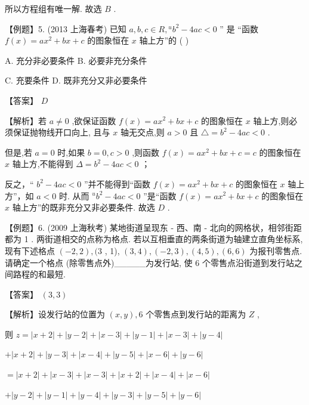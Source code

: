 \documentclass[10pt]{article}
\begin{document}
所以方程组有唯一解. 故选 \(B\) .

【例题】5. (2013 上海春考) 已知 \(a,b,c \in  R,{}^{u}{b}^{2} - {4ac} < 0\) ” 是 “函数 \(f\left( x\right)  = a{x}^{2} + {bx} + c\) 的图象恒在 \(x\) 轴上方”的 ( )

A. 充分非必要条件 B. 必要非充分条件

C. 充要条件 D. 既非充分又非必要条件

【答案】 \(D\)

【解析】若 \(a \neq  0\) ,欲保证函数 \(f\left( x\right)  = a{x}^{2} + {bx} + c\) 的图象恒在 \(x\) 轴上方,则必须保证抛物线开口向上, 且与 \(x\) 轴无交点,则 \(a > 0\) 且 \(\bigtriangleup  = {b}^{2} - {4ac} < 0\) .

但是,若 \(a = 0\) 时,如果 \(b = 0,c > 0\) ,则函数 \(f\left( x\right)  = a{x}^{2} + {bx} + c = c\) 的图象恒在 \(x\) 轴上方,不能得到 \(\Delta  = {b}^{2} - {4ac} < 0\) ；

反之，“ \({b}^{2} - {4ac} < 0\) ”并不能得到“函数 \(f\left( x\right)  = a{x}^{2} + {bx} + c\) 的图象恒在 \(x\) 轴上方”，如 \(a < 0\) 时. 从而 \({}^{u}{b}^{2} - {4ac} < 0\) ”是“函数 \(f\left( x\right)  = a{x}^{2} + {bx} + c\) 的图象恒在 \(x\) 轴上方”的既非充分又非必要条件. 故选 \(D\) .

【例题】6. (2009 上海秋考) 某地街道呈现东 - 西、南 - 北向的网格状，相邻街距都为 1 . 两街道相交的点称为格点. 若以互相垂直的两条街道为轴建立直角坐标系,现有下述格点 \(\left( {-2,2}\right) ,(3\) , 1), \(\left( {3,4}\right) ,\left( {-2,3}\right) ,\left( {4,5}\right) ,\left( {6,6}\right)\) 为报刊零售点. 请确定一个格点 (除零售点外)\_\_\_\_\_为发行站, 使 6 个零售点沿街道到发行站之间路程的和最短.

【答案】 \(\left( {3,3}\right)\)

【解析】设发行站的位置为 \(\left( {x,y}\right) ,6\) 个零售点到发行站的距离为 \(Z\) ,

则 \(z = \left| {x + 2}\right|  + \left| {y - 2}\right|  + \left| {x - 3}\right|  + \left| {y - 1}\right|  + \left| {x - 3}\right|  + \left| {y - 4}\right|\)

\(+ \left| {x + 2}\right|  + \left| {y - 3}\right|  + \left| {x - 4}\right|  + \left| {y - 5}\right|  + \left| {x - 6}\right|  + \left| {y - 6}\right|\)

\(= \left| {x + 2}\right|  + \left| {x - 3}\right|  + \left| {x - 3}\right|  + \left| {x + 2}\right|  + \left| {x - 4}\right|  + \left| {x - 6}\right|\)

\(+ \left| {y - 2}\right|  + \left| {y - 1}\right|  + \left| {y - 4}\right|  + \left| {y - 3}\right|  + \left| {y - 5}\right|  + \left| {y - 6}\right|\)
\end{document}
